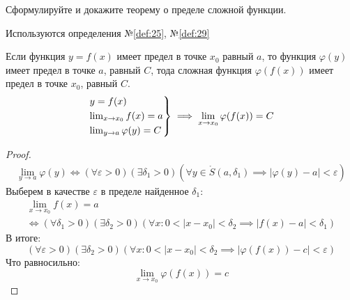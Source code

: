 \begin{question}
    Сформулируйте и докажите теорему о пределе сложной функции.
\end{question}
\begin{used}
    Используются определения №\ref{def:25}, №\ref{def:29}
\end{used}
\begin{theorem}
    Если функция $y = f(x)$ имеет предел в точке  $x_0$ равный $a$, то функция  $\varphi(y)$ имеет предел в точке $a$, равный $C$, тода сложная функция  $\varphi(f(x))$ имеет предел в точке $x_0$, равный $C$.
    \begin{gather*}
        \begin{rcases}
            y = f(x) \\
            \lim_{x \to x_0} f(x) = a \\
            \lim_{y \to a} \varphi(y) = C \\
        \end{rcases}
        \implies \lim_{x \to x_0} \varphi(f(x)) = C
    \end{gather*}
\end{theorem}
\begin{proof}
    \begin{gather*}
        \lim_{y \to a} \varphi(y) \iff (\forall \varepsilon > 0)(\exists \delta_1 > 0)(\forall y \in \mathring{S}(a, \delta_1) \implies |\varphi(y) - a| < \varepsilon) \tag{1}
    \end{gather*}
    Выберем в качестве $\varepsilon$ в пределе найденное $\delta_1$:
    \begin{gather*}
        \lim_{x \to x_0} f(x) = a \\
        \iff (\forall \delta_1 > 0)(\exists \delta_2 > 0)(\forall x: 0 < |x - x_0| < \delta_2 \implies |f(x) - a| < \delta_1) \tag{2} 
    \end{gather*}
    В итоге: \[
        (\forall \varepsilon > 0)(\exists \delta_2 > 0)(\forall x: 0 < |x - x_0| < \delta_2 \implies |\varphi(f(x)) - c| < \varepsilon)
    \] 
    Что равносильно: \[
        \lim_{x \to x_0} \varphi(f(x)) = c
    \] 
\end{proof}



